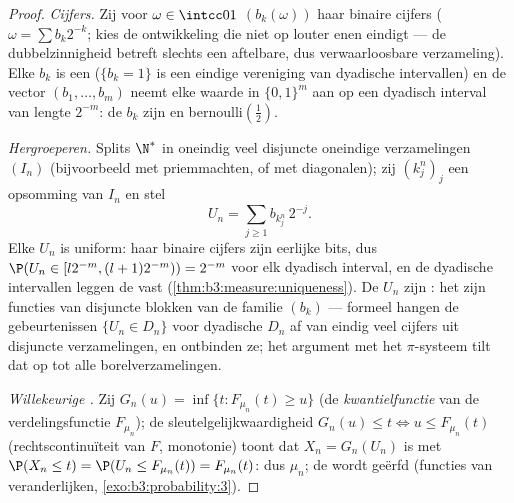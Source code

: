 \begin{proof}
\emph{Cijfers.} Zij voor $\omega \in \intcc01$ $(b_k(\omega))$
haar binaire cijfers ($\omega = \sum b_k2^{-k}$; kies de
ontwikkeling die niet op louter enen eindigt --- de
dubbelzinnigheid betreft slechts een aftelbare, dus
verwaarloosbare verzameling). Elke $b_k$ is een
 ($\{b_k = 1\}$ is een eindige vereniging van
dyadische intervallen) en de vector $(b_1, \dots, b_m)$ neemt
elke waarde in $\{0,1\}^m$ aan op een dyadisch interval van
lengte $2^{-m}$: de $b_k$ zijn  en
bernoulli$(\frac12)$.

\emph{Hergroeperen.} Splits $\N^*$ in oneindig veel disjuncte
oneindige verzamelingen $(I_n)$ (bijvoorbeeld met priemmachten,
of met diagonalen); zij $(k^n_j)_j$ een opsomming van $I_n$ en
stel
\[
U_n = \sum_{j\geq1} b_{k^n_j}\,2^{-j} .
\]
Elke $U_n$ is uniform: haar binaire cijfers zijn 
eerlijke bits, dus $\P(U_n \in [l2^{-m}, (l+1)2^{-m})) = 2^{-m}$
voor elk dyadisch interval, en de dyadische intervallen leggen de
 vast (\cref{thm:b3:measure:uniqueness}). De $U_n$ zijn
: het zijn functies van disjuncte blokken van de
 familie $(b_k)$ --- formeel hangen de
gebeurtenissen $\{U_n \in D_n\}$ voor dyadische $D_n$ af van
eindig veel cijfers uit disjuncte verzamelingen, en ontbinden ze;
het argument met het $\pi$-systeem tilt dat op tot alle
borelverzamelingen.

\emph{Willekeurige .} Zij $G_n(u) = \inf\{t :
F_{\mu_n}(t) \geq u\}$ (de \emph{kwantielfunctie} van de
verdelingsfunctie $F_{\mu_n}$); de sleutelgelijkwaardigheid
$G_n(u) \leq t \iff u \leq F_{\mu_n}(t)$ (rechtscontinuïteit van
$F$, monotonie) toont dat $X_n = G_n(U_n)$  is met
$\P(X_n \leq t) = \P(U_n \leq F_{\mu_n}(t)) = F_{\mu_n}(t)$: dus
 $\mu_n$; de  wordt geërfd (functies
van  veranderlijken,
\cref{exo:b3:probability:3}).
\end{proof}

